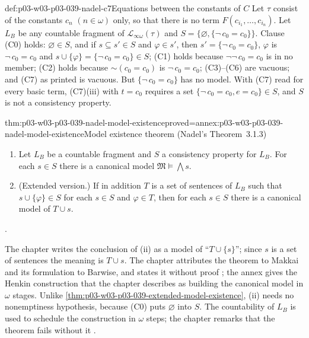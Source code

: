 \begin{hbwarning}{def:p03-w03-p03-039-nadel-c7}{Equations between the constants of \(C\)}
Let \(\tau\) consist of the constants \(c_n\) \((n\in\omega)\) only, so that
there is no term \(F(c_{i_1},\dots,c_{i_n})\). Let \(L_B\) be any countable
fragment of \(\mathscr L_{\infty\omega}(\tau)\) and
\(S=\{\varnothing,\{\neg\,c_0=c_0\}\}\). Clause (C0) holds: \(\varnothing\in S\), and if
\(s\subseteq s'\in S\) and \(\varphi\in s'\), then \(s'=\{\neg\,c_0=c_0\}\),
\(\varphi\) is \(\neg\,c_0=c_0\) and
\(s\cup\{\varphi\}=\{\neg\,c_0=c_0\}\in S\); (C1) holds because \(\neg\neg\,c_0=c_0\) is in no
member; (C2) holds because \({\sim}(c_0=c_0)\) is \(\neg\,c_0=c_0\);
(C3)--(C6) are vacuous; and (C7) as printed is vacuous. But
\(\{\neg\,c_0=c_0\}\) has no model. With (C7) read for every basic term,
(C7)(iii) with \(t=c_0\) requires a set \(\{\neg\,c_0=c_0,e=c_0\}\in S\), and
\(S\) is not a consistency property.
\end{hbwarning}

\begin{hbtheorem}{thm:p03-w03-p03-039-nadel-model-existence}{proved=annex:p03-w03-p03-039-nadel-model-existence}{Model existence theorem (Nadel's Theorem~3.1.3)}
\begin{enumerate}
\item[(i)] Let \(L_B\) be a countable fragment and \(S\) a consistency
      property for \(L_B\). For each \(s\in S\) there is a canonical model
      \(\mathfrak M\models\bigwedge s\).
\item[(ii)] (Extended version.) If in addition \(T\) is a set of sentences
      of \(L_B\) such that \(s\cup\{\varphi\}\in S\) for each \(s\in S\) and
      \(\varphi\in T\), then for each \(s\in S\) there is a canonical model
      of \(T\cup s\).
\end{enumerate}
\cite[Thm.~3.1.3, p.~279]{Nadel1985Admissible}.
\end{hbtheorem}

The chapter writes the conclusion of (ii) as a model of
``\(T\cup\{s\}\)''; since \(s\) is a set of sentences the meaning is
\(T\cup s\). The chapter attributes the theorem to Makkai and its
formulation to Barwise, and states it without proof
\cite[p.~279]{Nadel1985Admissible}; the annex gives the Henkin
construction that the chapter describes as building the canonical model in
\(\omega\) stages. Unlike \cref{thm:p03-w03-p03-039-extended-model-existence},
(ii) needs no nonemptiness hypothesis, because (C0) puts \(\varnothing\) into
\(S\). The countability of \(L_B\) is used to schedule the construction in
\(\omega\) steps; the chapter remarks that the theorem fails without it
\cite[p.~280]{Nadel1985Admissible}.

